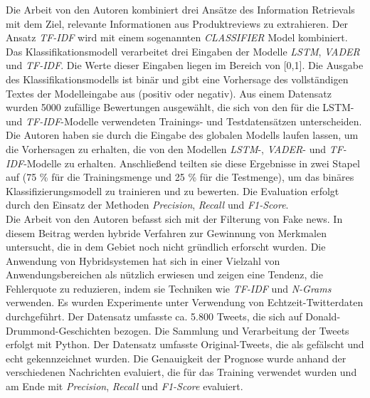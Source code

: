 Die Arbeit \cite{chiny2021lstm} von den Autoren \citeauthor{chiny2021lstm} kombiniert drei Ansätze des Information Retrievals mit dem Ziel, relevante Informationen aus Produktreviews zu extrahieren. Der Ansatz \emph{TF-IDF} wird mit einem sogenannten \emph{CLASSIFIER} Model kombiniert. Das Klassifikationsmodell verarbeitet drei Eingaben der Modelle \emph{LSTM}, \emph{VADER} und \emph{TF-IDF}. Die Werte dieser Eingaben liegen im Bereich von [0,1]. Die Ausgabe des Klassifikationsmodells ist binär und gibt eine Vorhersage des vollständigen Textes der Modelleingabe aus (positiv oder negativ). Aus einem Datensatz wurden 5000 zufällige Bewertungen ausgewählt, die sich von den für die LSTM- und \emph{TF-IDF}-Modelle verwendeten Trainings- und Testdatensätzen unterscheiden. Die Autoren \citeauthor{chiny2021lstm} haben sie durch die Eingabe des globalen Modells laufen lassen, um die Vorhersagen zu erhalten, die von den Modellen \emph{LSTM}-, \emph{VADER}- und \emph{TF-IDF}-Modelle zu erhalten. Anschließend teilten sie diese Ergebnisse in zwei Stapel auf (75 \% für die Trainingsmenge und 25 \% für die Testmenge), um das binäres Klassifizierungsmodell zu trainieren und zu bewerten. Die Evaluation erfolgt durch den Einsatz der Methoden \emph{Precision}, \emph{Recall} und \emph{F1-Score}.\\

Die Arbeit \cite{suhasini2021hybrid} von den Autoren \citeauthor{suhasini2021hybrid} befasst sich mit der Filterung von Fake news. In diesem Beitrag werden hybride Verfahren zur Gewinnung von Merkmalen untersucht, die in dem Gebiet noch nicht gründlich erforscht wurden. Die Anwendung von Hybridsystemen hat sich in einer Vielzahl von Anwendungsbereichen als nützlich erwiesen und zeigen eine Tendenz, die Fehlerquote zu reduzieren, indem sie Techniken wie \emph{TF-IDF} und \emph{N-Grams} verwenden. Es wurden Experimente unter Verwendung von Echtzeit-Twitterdaten durchgeführt. Der Datensatz umfasste ca. 5.800 Tweets, die sich auf Donald-Drummond-Geschichten bezogen. Die Sammlung und Verarbeitung der Tweets erfolgt mit Python. Der Datensatz umfasste Original-Tweets, die als gefälscht und echt gekennzeichnet wurden. Die Genauigkeit der Prognose wurde anhand der verschiedenen Nachrichten evaluiert, die für das Training verwendet wurden und am Ende mit \emph{Precision}, \emph{Recall} und \emph{F1-Score} evaluiert.\\

